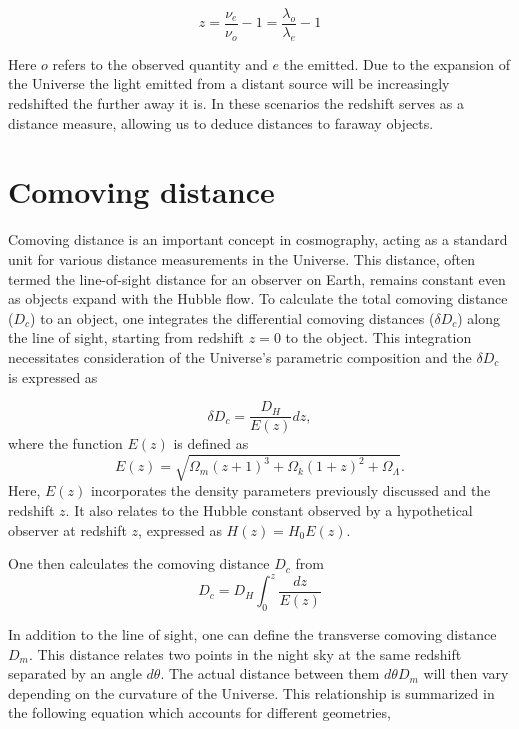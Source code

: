 \begin{equation}
    z = \frac{\nu_e}{\nu_o}-1 = \frac{\lambda_o}{\lambda_e}-1
\end{equation}

Here $o$ refers to the observed quantity and $e$ the emitted. Due to the expansion of the Universe the light emitted from a distant source will be increasingly redshifted the further away it is.
In these scenarios the redshift serves as a distance measure, allowing us to deduce distances to faraway objects.



\section{Comoving distance}
\label{sec:comoving_distance}


Comoving distance is an important concept in cosmography, 
acting as a standard unit for various distance measurements in the Universe. 
This distance, often termed the line-of-sight distance for an observer on Earth, 
remains constant even as objects expand with the Hubble flow. 
To calculate the total comoving distance ($D_c$) to an object, 
one integrates the differential comoving distances ($\delta D_c$) along the line of sight, starting from redshift 
$z=0$ to the object. This integration necessitates consideration of the Universe's parametric composition and the $\delta D_c$ is expressed as

\begin{equation}
    \delta D_c = \frac{D_H}{E(z)}dz,
\end{equation}
where the function $E(z)$ is defined as
\begin{equation}
    E(z)  = \sqrt{\Omega_m(z+1)^3 +\Omega_k (1+z)^2 + \Omega_\Lambda  }.
\end{equation}
Here, 
$E(z)$ incorporates the density parameters previously discussed and the redshift 
$z$. It also relates to the Hubble constant observed by a hypothetical observer at redshift $z$, expressed as 
$H(z) = H_0 E(z)$.

One then calculates the comoving distance $D_c$ from 
\begin{equation}
    D_c =D_H \int_0^z\frac{dz}{E(z)}
\end{equation}

In addition to the line of sight, one can define the transverse comoving distance $D_m$. This distance 
relates two points in the night sky at the same redshift separated by an angle $d\theta$. The actual distance
between them $d\theta D_m$ will then vary depending on the curvature of the Universe. This relationship is summarized in the following equation
which accounts for different geometries,


